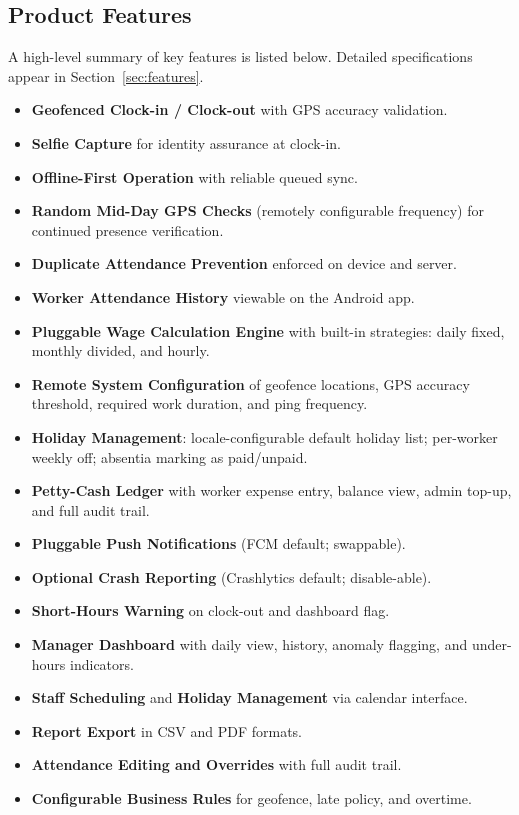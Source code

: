 \documentclass[12pt, a4paper]{article}
\begin{document}
\subsection{Product Features}
A high-level summary of key features is listed below. Detailed
specifications appear in Section~\ref{sec:features}.

\begin{itemize}
    \item \textbf{Geofenced Clock-in / Clock-out} with GPS accuracy
          validation.
    \item \textbf{Selfie Capture} for identity assurance at clock-in.
    \item \textbf{Offline-First Operation} with reliable queued sync.
    \item \textbf{Random Mid-Day GPS Checks} (remotely configurable
          frequency) for continued presence verification.
    \item \textbf{Duplicate Attendance Prevention} enforced on device
          and server.
    \item \textbf{Worker Attendance History} viewable on the Android app.
    \item \textbf{Pluggable Wage Calculation Engine} with built-in
          strategies: daily fixed, monthly divided, and hourly.
    \item \textbf{Remote System Configuration} of geofence locations,
          GPS accuracy threshold, required work duration, and ping
          frequency.
    \item \textbf{Holiday Management}: locale-configurable default
          holiday list; per-worker weekly off; absentia marking as
          paid/unpaid.
    \item \textbf{Petty-Cash Ledger} with worker expense entry, balance
          view, admin top-up, and full audit trail.
    \item \textbf{Pluggable Push Notifications} (FCM default; swappable).
    \item \textbf{Optional Crash Reporting} (Crashlytics default;
          disable-able).
    \item \textbf{Short-Hours Warning} on clock-out and dashboard flag.
    \item \textbf{Manager Dashboard} with daily view, history, anomaly
          flagging, and under-hours indicators.
    \item \textbf{Staff Scheduling} and \textbf{Holiday Management} via
          calendar interface.
    \item \textbf{Report Export} in CSV and PDF formats.
    \item \textbf{Attendance Editing and Overrides} with full audit trail.
    \item \textbf{Configurable Business Rules} for geofence, late policy,
          and overtime.
\end{itemize}
\end{document}
